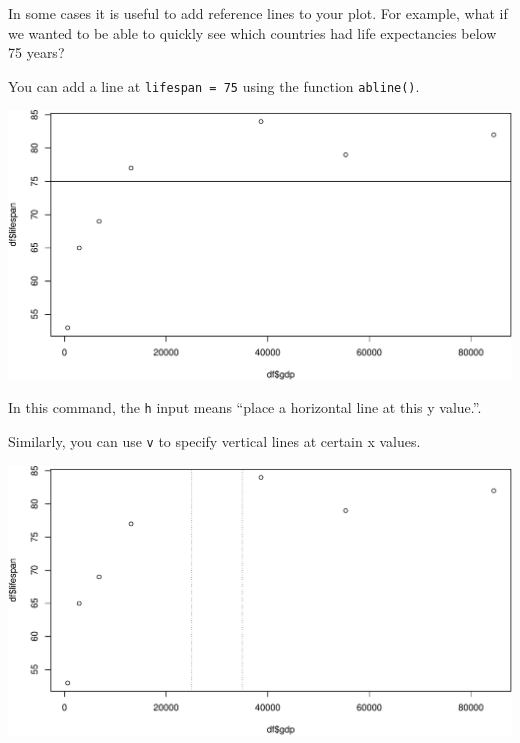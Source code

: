\documentclass[]{book}
\newenvironment{Shaded}{\begin{snugshade}}{\end{snugshade}}
\newcommand{\DataTypeTok}[1]{\textcolor[rgb]{0.13,0.29,0.53}{#1}}
\newcommand{\DecValTok}[1]{\textcolor[rgb]{0.00,0.00,0.81}{#1}}
\newcommand{\KeywordTok}[1]{\textcolor[rgb]{0.13,0.29,0.53}{\textbf{#1}}}
\newcommand{\NormalTok}[1]{#1}
\newcommand{\OperatorTok}[1]{\textcolor[rgb]{0.81,0.36,0.00}{\textbf{#1}}}
\newcommand{\StringTok}[1]{\textcolor[rgb]{0.31,0.60,0.02}{#1}}
\begin{document}
In some cases it is useful to add reference lines to your plot. For example, what if we wanted to be able to quickly see which countries had life expectancies below 75 years?

You can add a line at \texttt{lifespan\ =\ 75} using the function \texttt{abline()}.

\begin{Shaded}
\end{Shaded}

\includegraphics{figures/unnamed-chunk-614-1.pdf}

In this command, the \texttt{h} input means ``place a horizontal line at this y value.''.

Similarly, you can use \texttt{v} to specify vertical lines at certain x values.

\begin{Shaded}
\end{Shaded}

\includegraphics{figures/unnamed-chunk-615-1.pdf}
\end{document}
